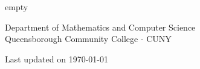 
\let\cleardoublepage

\thispagestyle{empty}%

	\vspace*{0.1\textheight}
	\begin{center}\leavevmode
		\normalfont
		{\HUGE\raggedright \textbf{\@title}\par}%
		\hrulefill\par
		{\huge\raggedleft {\@author}\par}%
		\vskip 1cm
	\end{center}%

	\vfill

	\begin{center}\large
		Department of Mathematics and Computer Science\\

		Queensborough Community College - CUNY\\

		\the\year
	\end{center}

	\vspace*{2\baselineskip}

  \begin{center}
    {\color{blue} 
      Last updated on {\today}
    }
   \end{center}

   \newpage